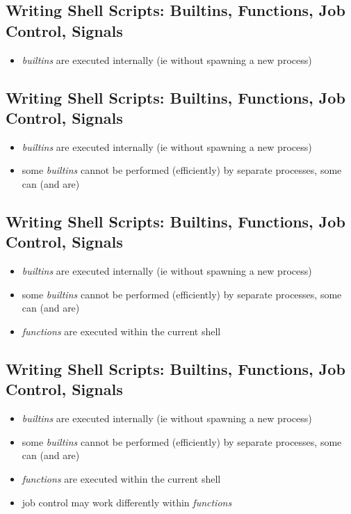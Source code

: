 \documentclass[xga]{xdvislides}
\begin{document}
\subsection{Writing Shell Scripts: Builtins, Functions, Job Control, Signals}
\begin{itemize}
	\item {\em builtins} are executed internally (ie without spawning a
		new process)
\end{itemize}

\subsection{Writing Shell Scripts: Builtins, Functions, Job Control, Signals}
\begin{itemize}
	\item {\em builtins} are executed internally (ie without spawning a
		new process)
	\item some {\em builtins} cannot be performed (efficiently) by
		separate processes, some can (and are)
\end{itemize}

\subsection{Writing Shell Scripts: Builtins, Functions, Job Control, Signals}
\begin{itemize}
	\item {\em builtins} are executed internally (ie without spawning a
		new process)
	\item some {\em builtins} cannot be performed (efficiently) by
		separate processes, some can (and are)
	\item {\em functions} are executed within the current shell
\end{itemize}

\subsection{Writing Shell Scripts: Builtins, Functions, Job Control, Signals}
\begin{itemize}
	\item {\em builtins} are executed internally (ie without spawning a
		new process)
	\item some {\em builtins} cannot be performed (efficiently) by
		separate processes, some can (and are)
	\item {\em functions} are executed within the current shell
	\item job control may work differently within {\em functions}
\end{itemize}
\end{document}
